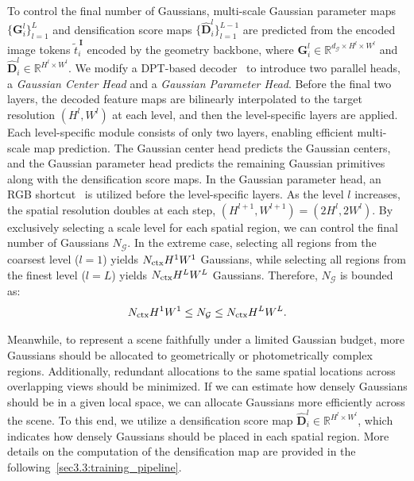 
To control the final number of Gaussians, multi-scale Gaussian parameter maps $\{\mathbf{G}^l_i\}_{l=1}^L$ and densification score maps $\{\hat{\mathbf{D}}^l_i\}_{l=1}^{L-1}$ are predicted from the encoded image tokens $\tilde{t}^{\,\mathbf{I}}_i$ encoded by the geometry backbone, where $\mathbf{G}^l_i\in \mathbb{R}^{d_\mathcal{G} \times H^l \times W^l}$ and $\hat{\mathbf{D}}^l_i\in \mathbb{R}^{H^l \times W^l}$.
We modify a DPT-based decoder~\cite{ranftl2021dpt} to introduce two parallel heads, a \textit{Gaussian Center Head} and a \textit{Gaussian Parameter Head}. 
Before the final two layers, the decoded feature maps are bilinearly interpolated to the target resolution $(H^l, W^l)$ at each level, and then the level-specific layers are applied. 
Each level-specific module consists of only two layers, enabling efficient multi-scale map prediction.
The Gaussian center head predicts the Gaussian centers, and the Gaussian parameter head predicts the remaining Gaussian primitives along with the densification score maps. In the Gaussian parameter head, an RGB shortcut~\cite{ye2024nopo} is utilized before the level-specific layers.
As the level $l$ increases, the spatial resolution doubles at each step, $(H^{l+1}, W^{l+1}) \!=\! (2H^{l}, 2W^{l})$. By exclusively selecting a scale level for each spatial region, we can control the final number of Gaussians $N_\mathcal{G}$. In the extreme case, selecting all regions from the coarsest level ($l\!=\!1$) yields $N_{\text{ctx}} H^1W^1$ Gaussians, while selecting all regions from the finest level ($l\!=\!L$) yields $N_{\text{ctx}} H^LW^L$ Gaussians. Therefore, $N_\mathcal{G}$ is bounded as:
\begin{equation}
    N_{\text{ctx}} H^1 W^1 \leq N_\mathcal{G} \leq N_{\text{ctx}} H^L W^L.
\end{equation}

Meanwhile, to represent a scene faithfully under a limited Gaussian budget, more Gaussians should be allocated to geometrically or photometrically complex regions. Additionally, redundant allocations to the same spatial locations across overlapping views should be minimized. If we can estimate how densely Gaussians should be in a given local space, we can allocate Gaussians more efficiently across the scene. 
To this end, we utilize a densification score map  $\hat{\mathbf{D}}^l_i \in \mathbb{R}^{H^l \times W^l}$, which indicates how densely Gaussians should be placed in each spatial region. More details on the computation of the densification map are provided in the following~\cref{sec3.3:training_pipeline}.

